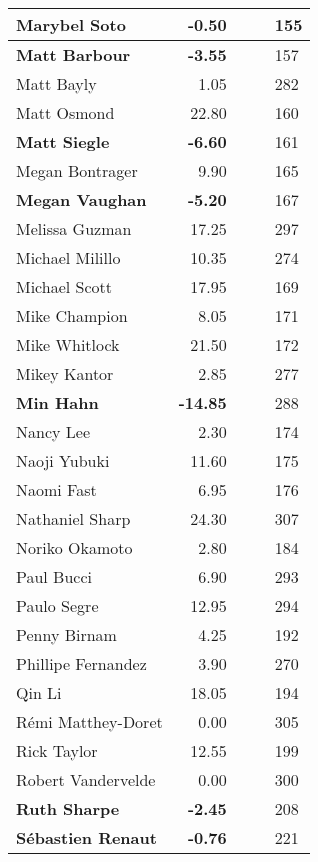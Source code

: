 \begin{longtable}{|p{5cm}|r|p{9cm}|p{6cm}|l|}
   \hline
\textbf{Marybel Soto} & \textbf{-0.50} &  &  & 155 \\ 
   \hline
\textbf{Matt Barbour} & \textbf{-3.55} &  &  & 157 \\ 
   \hline
Matt Bayly & 1.05 &  &  & 282 \\ 
   \hline
Matt Osmond & 22.80 &  &  & 160 \\ 
   \hline
\textbf{Matt Siegle} & \textbf{-6.60} &  &  & 161 \\ 
   \hline
Megan Bontrager & 9.90 &  &  & 165 \\ 
   \hline
\textbf{Megan Vaughan} & \textbf{-5.20} &  &  & 167 \\ 
   \hline
Melissa Guzman & 17.25 &  &  & 297 \\ 
   \hline
Michael Milillo & 10.35 &  &  & 274 \\ 
   \hline
Michael Scott & 17.95 &  &  & 169 \\ 
   \hline
Mike Champion & 8.05 &  &  & 171 \\ 
   \hline
Mike Whitlock & 21.50 &  &  & 172 \\ 
   \hline
Mikey Kantor & 2.85 &  &  & 277 \\ 
   \hline
\textbf{Min Hahn} & \textbf{-14.85} &  &  & 288 \\ 
   \hline
Nancy Lee & 2.30 &  &  & 174 \\ 
   \hline
Naoji Yubuki & 11.60 &  &  & 175 \\ 
   \hline
Naomi Fast & 6.95 &  &  & 176 \\ 
   \hline
Nathaniel Sharp & 24.30 &  &  & 307 \\ 
   \hline
Noriko Okamoto & 2.80 &  &  & 184 \\ 
   \hline
Paul Bucci & 6.90 &  &  & 293 \\ 
   \hline
Paulo Segre & 12.95 &  &  & 294 \\ 
   \hline
Penny Birnam & 4.25 &  &  & 192 \\ 
   \hline
Phillipe Fernandez & 3.90 &  &  & 270 \\ 
   \hline
Qin Li & 18.05 &  &  & 194 \\ 
   \hline
R\'emi Matthey-Doret & 0.00 &  &  & 305 \\ 
   \hline
Rick Taylor & 12.55 &  &  & 199 \\ 
   \hline
Robert Vandervelde & 0.00 &  &  & 300 \\ 
   \hline
\textbf{Ruth Sharpe} & \textbf{-2.45} &  &  & 208 \\ 
   \hline
\textbf{S\'ebastien Renaut} & \textbf{-0.76} &  &  & 221 \\ 

\end{longtable}
